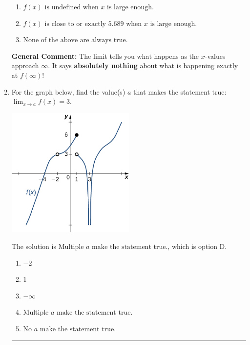 \documentclass{extbook}[14pt]
\newcommand{\litem}[1]{\item #1

\rule{\textwidth}{0.4pt}}
\begin{document}
\begin{enumerate}
{\begin{enumerate}[label=\Alph*.]
\item \( f(x) \text{ is undefined when } x \text{ is large enough}. \)


\item \( f(x) \text{ is close to or exactly } 5.689 \text{ when } x \text{ is large enough}. \)


\item \( \text{None of the above are always true.} \)


\end{enumerate}

\textbf{General Comment:} The limit tells you what happens as the $x$-values approach $\infty$. It says \textbf{absolutely nothing} about what is happening exactly at $f(\infty)$!
}
\litem{
For the graph below, find the value(s) $a$ that makes the statement true: $ \displaystyle \lim_{x \rightarrow a} f(x) = 3$.

\begin{center}
    \includegraphics[width=0.5\textwidth]{../Figures/evaluateLimitGraphicallyB.png}
\end{center}


The solution is \( \text{Multiple } a \text{ make the statement true}. \), which is option D.\begin{enumerate}[label=\Alph*.]
\item \( -2 \)


\item \( 1 \)


\item \( -\infty \)


\item \( \text{Multiple } a \text{ make the statement true}. \)


\item \( \text{No } a \text{ make the statement true}. \)


\end{enumerate}

}
\end{enumerate}
\end{document}
